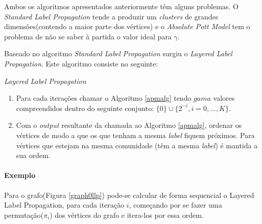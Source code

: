   Ambos os algoritmos apresentados anteriormente têm alguns problemas. O \textit{Standard Label Propagation} tende a produzir um \textit{clusters} de grandes dimensões(contendo a maior parte dos vértices) e o \textit{Absolute Pott Model} tem o problema de não se saber à partida o valor ideal para $\gamma$.
  
  Baseado no algoritmo \textit{Standard Label Propagation} surgiu o \textit{Layered Label Propagation}. Este algoritmo consiste no seguinte:
  
  \begin{algorithm}[H]
    \caption{\textit{Layered Label Propagation}}\label{llpalg}
    \begin{enumerate}
    \item Para cada iterações chamar o Algoritmo \ref{apmalg} tendo $gama$ valores compreendidos dentro do seguinte conjunto: $\{0\}\cup\{2^{{-}i},i=0,...,K\} $.
    \item Com o \textit{output} resultante da chamada ao Algoritmo \ref{apmalg}, ordenar os vértices de modo a que os que tenham a mesma \textit{label} fiquem próximos. Para vértices que estejam na mesma comunidade (têm a mesma \textit{label}) é mantida a sua ordem.
    \end{enumerate} 
  \end{algorithm}
  
  \paragraph{Exemplo} Para o grafo(Figura \ref{graph0llp}) pode-se calcular de forma sequencial o Layered Label Propagation, para cada iteração $i$, começando por se fazer uma permutação($\pi_i$) dos vértices do grafo e itera-los por essa ordem. 
  

